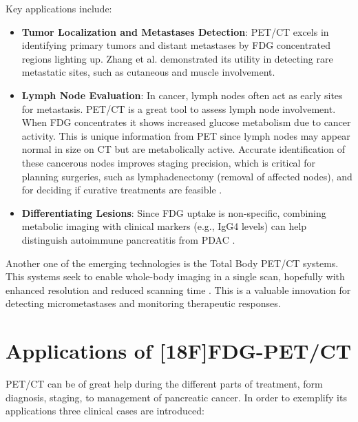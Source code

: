 \documentclass[11pt]{article} %
\begin{document}
Key applications include:
\begin{itemize}
    \item \textbf{Tumor Localization and Metastases Detection}: PET/CT excels in identifying primary tumors and distant metastases by FDG concentrated regions lighting up. Zhang et al. demonstrated its utility in detecting rare metastatic sites, such as cutaneous and muscle involvement\cite{Zhang2023}.
    \item \textbf{Lymph Node Evaluation}: In cancer, lymph nodes often act as early sites for metastasis. PET/CT is a great tool to assess lymph node involvement. When FDG concentrates it shows increased glucose metabolism due to cancer activity. This is unique information from PET since lymph nodes may appear normal in size on CT but are metabolically active. Accurate identification of these cancerous nodes improves staging precision, which is critical for planning surgeries, such as lymphadenectomy (removal of affected nodes), and for deciding if curative treatments are feasible \cite{TG174}.
    \item \textbf{Differentiating Lesions}: Since FDG uptake is non-specific, combining metabolic imaging with clinical markers (e.g., IgG4 levels) can help distinguish autoimmune pancreatitis from PDAC \cite{Zheng2018}.
\end{itemize}

Another one of the emerging technologies is the Total Body PET/CT systems. This systems seek to enable whole-body imaging in a single scan, hopefully with enhanced resolution and reduced scanning time \cite{SunderlandSeminar}. This is a valuable innovation for detecting micrometastases and monitoring therapeutic responses.

\section{Applications of [18F]FDG-PET/CT}

PET/CT can be of great help during the different parts of treatment, form diagnosis, staging, to management of pancreatic cancer. In order to exemplify its applications three clinical cases are introduced:
\end{document}
